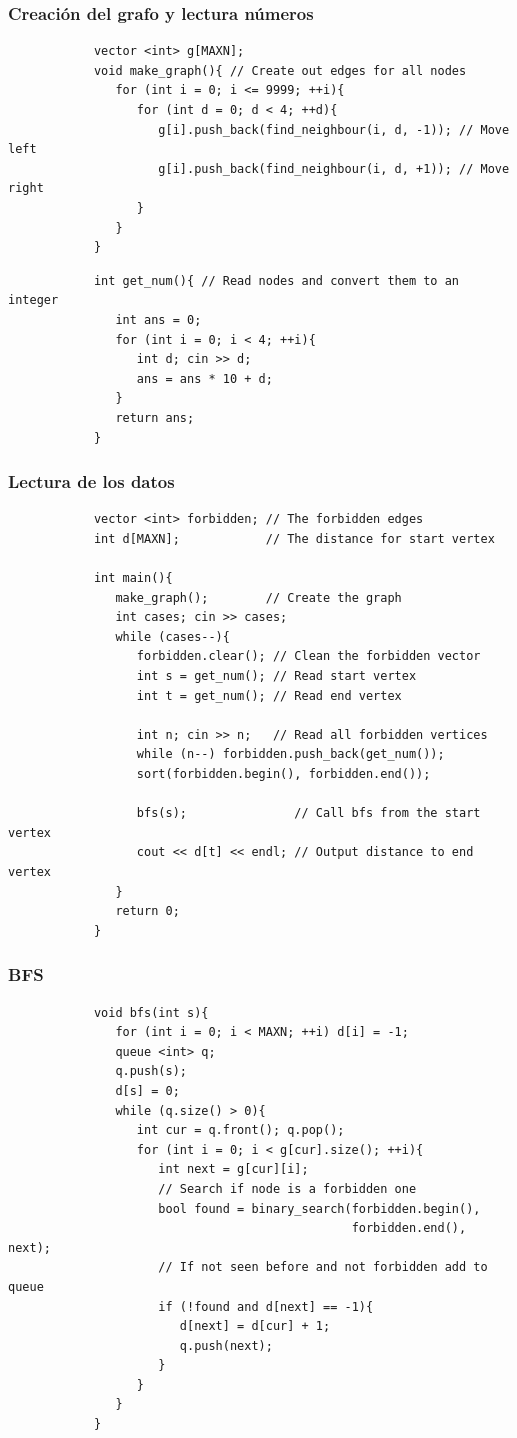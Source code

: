 \documentclass{beamer}
\begin{document}
	\begin{frame}[fragile]
		\frametitle{Creación del grafo y lectura números}
		\begin{lstlisting}
			vector <int> g[MAXN];
			void make_graph(){ // Create out edges for all nodes
			   for (int i = 0; i <= 9999; ++i){
			      for (int d = 0; d < 4; ++d){
			         g[i].push_back(find_neighbour(i, d, -1)); // Move left
			         g[i].push_back(find_neighbour(i, d, +1)); // Move right
			      }
			   }
			}
		\end{lstlisting}
		
		\begin{lstlisting}
			int get_num(){ // Read nodes and convert them to an integer
			   int ans = 0;
			   for (int i = 0; i < 4; ++i){
			      int d; cin >> d;
			      ans = ans * 10 + d;
			   }
			   return ans;
			}
		\end{lstlisting}
	\end{frame}
	
	\begin{frame}[fragile]
		\frametitle{Lectura de los datos}
		\begin{lstlisting}
			vector <int> forbidden; // The forbidden edges
			int d[MAXN];            // The distance for start vertex

			int main(){
			   make_graph();        // Create the graph
			   int cases; cin >> cases;
			   while (cases--){
			      forbidden.clear(); // Clean the forbidden vector
			      int s = get_num(); // Read start vertex
			      int t = get_num(); // Read end vertex

			      int n; cin >> n;   // Read all forbidden vertices
			      while (n--) forbidden.push_back(get_num());
			      sort(forbidden.begin(), forbidden.end());
		
			      bfs(s);               // Call bfs from the start vertex
			      cout << d[t] << endl; // Output distance to end vertex
			   }
			   return 0;
			}
		\end{lstlisting}
	\end{frame}
	
	\begin{frame}[fragile]
		\frametitle{BFS}
		\begin{lstlisting}
			void bfs(int s){
			   for (int i = 0; i < MAXN; ++i) d[i] = -1;
			   queue <int> q;
			   q.push(s);
			   d[s] = 0;
			   while (q.size() > 0){
			      int cur = q.front(); q.pop();
			      for (int i = 0; i < g[cur].size(); ++i){
			         int next = g[cur][i];
			         // Search if node is a forbidden one
			         bool found = binary_search(forbidden.begin(), 
			                                    forbidden.end(), next);
			         // If not seen before and not forbidden add to queue
			         if (!found and d[next] == -1){ 
			            d[next] = d[cur] + 1;
			            q.push(next);
			         }
			      }
			   }
			}
		\end{lstlisting}
	\end{frame}
\end{document}
